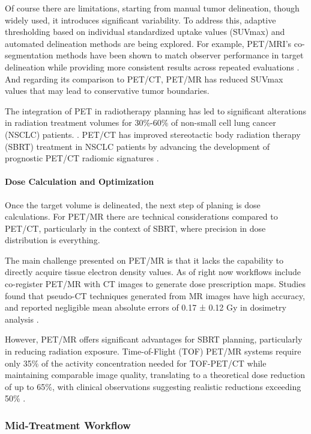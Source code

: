 \documentclass[11pt]{article} %
\begin{document}
\begin{multicols}{2}
Of course there are limitations, starting from manual tumor delineation, though widely used, it introduces significant variability. To address this, adaptive thresholding based on individual standardized uptake values (SUVmax) and automated delineation methods are being explored. For example, PET/MRI’s co-segmentation methods have been shown to match observer performance in target delineation while providing more consistent results across repeated evaluations \cite{yan2024}. And regarding its comparison to PET/CT, PET/MR has reduced SUVmax values that may lead to conservative tumor boundaries.

The integration of PET in radiotherapy planning has led to significant alterations in radiation treatment volumes for 30\%-60\% of non-small cell lung cancer (NSCLC) patients. \cite{Bradley2004}. PET/CT has improved stereotactic body radiation therapy (SBRT) treatment in NSCLC patients by advancing the development of prognostic PET/CT radiomic signatures \cite{Vijayakumar2022}.

\paragraph{Dose Calculation and Optimization}

Once the target volume is delineated, the next step of planing is dose calculations. For PET/MR there are technical considerations compared to PET/CT, particularly in the context of SBRT, where precision in dose distribution is everything.

The main challenge presented on PET/MR is that it lacks the capability to directly acquire tissue electron density values. As of right now workflows include co-register PET/MR with CT images to generate dose prescription maps. Studies found that pseudo-CT techniques generated from MR images have high accuracy, and reported negligible mean absolute errors of 0.17 ± 0.12 Gy in dosimetry analysis \cite{yan2024}.

However, PET/MR offers significant advantages for SBRT planning, particularly in reducing radiation exposure. Time-of-Flight (TOF) PET/MR systems require only 35\% of the activity concentration needed for TOF-PET/CT while maintaining comparable image quality, translating to a theoretical dose reduction of up to 65\%, with clinical observations suggesting realistic reductions exceeding 50\% \cite{Queiroz2015,Polan2023}. 

\subsubsection{Mid-Treatment Workflow}


\end{multicols}
\end{document}
